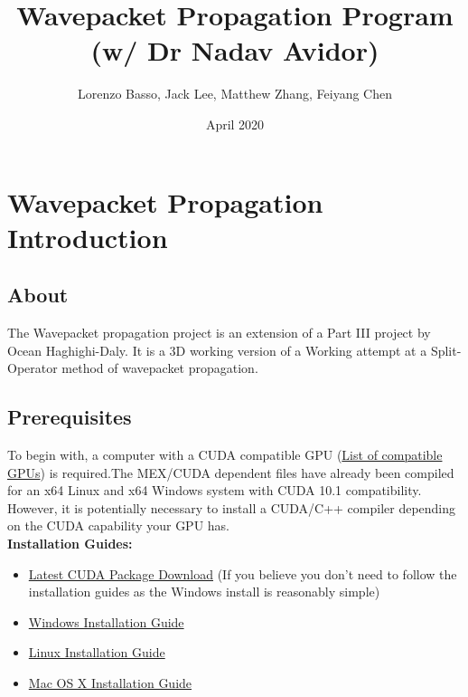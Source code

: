 \documentclass[11pt,letterpaper]{article}
\title{Wavepacket Propagation Program (w/ Dr Nadav Avidor)}
\author{Lorenzo Basso, Jack Lee, Matthew Zhang, Feiyang Chen}
\date{April 2020}
\begin{document}
\maketitle

\tableofcontents


\pagestyle{fancy}
\renewcommand{\subsectionmark}[1]{\markright{#1}{}}
\fancyfoot[C]{\thepage}%
\fancyhead[L]{\leftmark}
\fancyhead[R]{\rightmark}

\newpage

\section{Wavepacket Propagation Introduction}
\subsection{About}

The Wavepacket propagation project is an extension of a Part III project by Ocean Haghighi-Daly. It is a 3D working version of a Working attempt at a Split-Operator method of wavepacket propagation. 


\subsection{Prerequisites}

To begin with, a computer with a CUDA compatible GPU (\href{https://developer.nvidia.com/cuda-gpus#compute}{List of compatible GPUs}) is required.The MEX/CUDA dependent files have already been compiled for an x64 Linux and x64 Windows system with CUDA 10.1 compatibility. However, it is potentially necessary to install a CUDA/C++ compiler depending on the CUDA capability your GPU has.\\

\textbf{Installation Guides:}

\begin{itemize}
    \item \href{https://developer.nvidia.com/cuda-downloads?target_os=Windows&target_arch=x86_64}{Latest CUDA Package Download} (If you believe you don't need to follow the installation guides as the Windows install is reasonably simple)
    \item \href{https://docs.nvidia.com/cuda/cuda-installation-guide-microsoft-windows/index.html}{Windows Installation Guide}
    \item \href{https://docs.nvidia.com/cuda/cuda-installation-guide-linux/index.html}{Linux Installation Guide}
    \item \href{https://docs.nvidia.com/cuda/cuda-installation-guide-mac-os-x/index.html}{Mac OS X Installation Guide}
\end{itemize}
\end{document}
